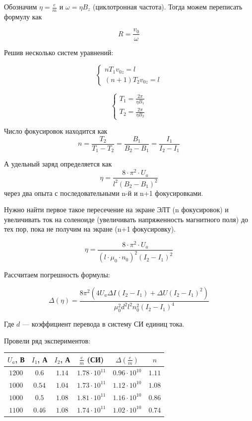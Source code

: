 Обозначим $\eta=\frac{e}{m}$ и $\omega=\eta{}B_z$ (циклотронная частота). Тогда можем переписать формулу как

\begin{equation}
	R=\frac{v_0}{\omega}
\end{equation}

Решив несколько систем уравнений:

$$
\begin{cases}
nT_1v_{0z}=l\\
(n+1)T_2v_{0z}=l
\end{cases}
$$

$$
\begin{cases}
T_1=\frac{2\pi}{\eta{}B_1}\\
T_2=\frac{2\pi}{\eta{}B_2}
\end{cases}
$$

Число фокусировок находится как $$n=\frac{T_2}{T_1-T_2}=\frac{B_1}{B_2-B_1}=\frac{I_1}{I_2-I_1}$$

А удельный заряд определяется как $$\eta=\frac{8\cdot\pi^2\cdot{}U_a}{l^2(B_2-B_1)^2}$$  через два опыта с последовательными n-й и n+1 фокусировками.

Нужно найти первое такое пересечение на экране ЭЛТ (n фокусировок) и увеличивать ток на соленоиде (увеличивать напряженность магнитного поля) до тех пор, пока не получим на экране (n+1 фокусировку).

$$\eta=\frac{8\cdot\pi^2\cdot{}U_a}{(l\cdot\mu_0\cdot{n_0})^2(I_2-I_1)^2}$$

Рассчитаем погрешность формулы:

$$\Delta{(\eta)}=\frac{8 \pi^{2} \left(4 U_{a} \Delta{I} \left(I_{2} - I_{1}\right) + \Delta{U} \left(I_{2} - I_{1}\right)^{2}\right)}{\mu_{0}^{2} d^{2} l^{2} n_{0}^{2} \left(I_{2} - I_{1}\right)^{4}}$$

Где $d$ --- коэффициент перевода в систему СИ единиц тока.

Провели ряд экспериментов: 

\begin{table}[h]
\begin{center}
\begin{tabular}{|c|c|c|c|c|c|}

\hline
$U_a$, В & $I_1$, А & $I_2$, А & $\frac{e}{m}$ (СИ) & $\Delta{(\frac{e}{m})}$ & $n$\\
\hline
$1200$ & $0.6$ & $1.14$ & $1.78\cdot10^{11}$ & $0.96\cdot10^{10}$  & $1.11$ \\ \hline
$1000$ & $0.54$ & $1.04$ & $1.73\cdot10^{11}$ & $1.12\cdot10^{10}$ & $1.08$ \\ \hline
$1000$ & $0.5$ & $1.08$ & $1.81\cdot10^{11}$ & $1.16\cdot10^{10}$  & $0.86$ \\ \hline
$1100$ & $0.46$ & $1.08$ & $1.74\cdot10^{11}$ & $1.02\cdot10^{10}$ & $0.74$ \\ \hline

\end{tabular}
\end{center}
\end{table} 



